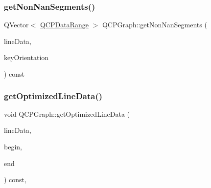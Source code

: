 \mbox{\label{class_q_c_p_graph_a0e0886b9ec7731d8993bbb104465f3b9}} 
\subsubsection{\texorpdfstring{get\+Non\+Nan\+Segments()}{getNonNanSegments()}}
{\footnotesize\ttfamily Q\+Vector$<$ \hyperlink{class_q_c_p_data_range}{Q\+C\+P\+Data\+Range} $>$ Q\+C\+P\+Graph\+::get\+Non\+Nan\+Segments (\begin{DoxyParamCaption}\item[{const Q\+Vector$<$ Q\+PointF $>$ $\ast$}]{line\+Data,  }\item[{Qt\+::\+Orientation}]{key\+Orientation }\end{DoxyParamCaption}) const\hspace{0.3cm}{\ttfamily [protected]}}

\mbox{\label{class_q_c_p_graph_a1fed1c9d627d9d3b49a6206cc2e60fe1}} 
\subsubsection{\texorpdfstring{get\+Optimized\+Line\+Data()}{getOptimizedLineData()}}
{\footnotesize\ttfamily void Q\+C\+P\+Graph\+::get\+Optimized\+Line\+Data (\begin{DoxyParamCaption}\item[{Q\+Vector$<$ \hyperlink{class_q_c_p_graph_data}{Q\+C\+P\+Graph\+Data} $>$ $\ast$}]{line\+Data,  }\item[{const \hyperlink{class_q_c_p_data_container_ae40a91f5cb0bcac61d727427449b7d15}{Q\+C\+P\+Graph\+Data\+Container\+::const\+\_\+iterator} \&}]{begin,  }\item[{const \hyperlink{class_q_c_p_data_container_ae40a91f5cb0bcac61d727427449b7d15}{Q\+C\+P\+Graph\+Data\+Container\+::const\+\_\+iterator} \&}]{end }\end{DoxyParamCaption}) const\hspace{0.3cm}{\ttfamily [protected]}, {\ttfamily [virtual]}}

\mbox{\label{class_q_c_p_graph_a5423245898537e375b9364cf26e89aea}} 

